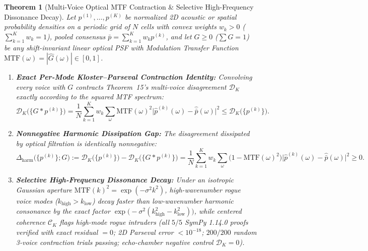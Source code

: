 \documentclass[11pt,letterpaper]{article}
\newtheorem{theorem}{Theorem}
\begin{document}
\begin{theorem}[Multi-Voice Optical MTF Contraction \& Selective High-Frequency Dissonance Decay]
\label{thm:harmonic_optics}
Let $p^{(1)},\dots,p^{(K)}$ be normalized 2D acoustic or spatial probability densities on a periodic grid of $N$ cells with convex weights $w_k > 0$ ($\sum_{k=1}^K w_k = 1$), pooled consensus $\bar{p} = \sum_{k=1}^K w_k p^{(k)}$, and let $G \ge 0$ ($\sum G = 1$) be any shift-invariant linear optical PSF with Modulation Transfer Function $\mathrm{MTF}(\omega) = |\widehat{G}(\omega)| \in [0, 1]$.
\begin{enumerate}
  \item \textbf{Exact Per-Mode Kloster--Parseval Contraction Identity:} Convolving every voice with $G$ contracts Theorem~15's multi-voice disagreement $\mathcal{D}_K$ exactly according to the squared MTF spectrum:
  \begin{equation}
    \mathcal{D}_K\!\big(\{G * p^{(k)}\}\big)
    = \frac{1}{N}\sum_{k=1}^K w_k \sum_{\omega} \mathrm{MTF}(\omega)^2 \big|\widehat{p}^{(k)}(\omega) - \widehat{\bar{p}}(\omega)\big|^2
    \le \mathcal{D}_K\!\big(\{p^{(k)}\}\big).
  \end{equation}
  \item \textbf{Nonnegative Harmonic Dissipation Gap:} The disagreement dissipated by optical filtration is identically nonnegative:
  \begin{equation}
    \Delta_{\mathrm{harm}}\!\big(\{p^{(k)}\}; G\big)
    := \mathcal{D}_K\!\big(\{p^{(k)}\}\big) - \mathcal{D}_K\!\big(\{G * p^{(k)}\}\big)
    = \frac{1}{N}\sum_{k=1}^K w_k \sum_{\omega}\big(1 - \mathrm{MTF}(\omega)^2\big)\big|\widehat{p}^{(k)}(\omega) - \widehat{\bar{p}}(\omega)\big|^2 \ge 0.
  \end{equation}
  \item \textbf{Selective High-Frequency Dissonance Decay:} Under an isotropic Gaussian aperture $\mathrm{MTF}(k)^2 = \exp(-\sigma^2 k^2)$, high-wavenumber rogue voice modes ($k_{\mathrm{high}} > k_{\mathrm{low}}$) decay faster than low-wavenumber harmonic consonance by the exact factor $\exp\!\big(-\sigma^2(k_{\mathrm{high}}^2 - k_{\mathrm{low}}^2)\big)$, while centered coherence $\mathcal{C}_K$ flags high-mode rogue intruders (all $5/5$ SymPy 1.14.0 proofs verified with exact residual $= 0$; 2D Parseval error $< 10^{-18}$; $200/200$ random 3-voice contraction trials passing; echo-chamber negative control $\mathcal{D}_K = 0$).
\end{enumerate}
\end{theorem}
\end{document}
